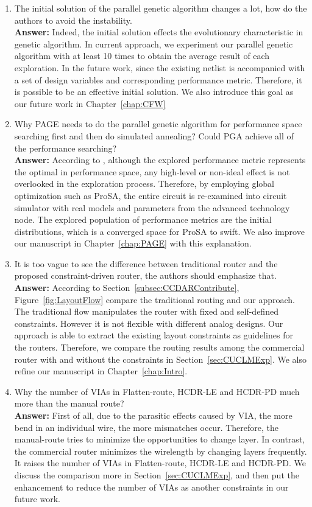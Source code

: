 \begin{enumerate}
  \item The initial solution of the parallel genetic algorithm changes a lot, how do the authors to avoid the instability.\\
  {\bf Answer:} Indeed, the initial solution effects the evolutionary characteristic in genetic algorithm. In current approach, we experiment our parallel genetic algorithm with at least 10 times to obtain the average result of each exploration. In the future work, since the existing netlist is accompanied with a set of design variables and corresponding performance metric. Therefore, it is possible to be an effective initial solution. We also introduce this goal as our future work in Chapter~\ref{chap:CFW}
  \item Why PAGE needs to do the parallel genetic algorithm for performance space searching first and then do simulated annealing? Could PGA achieve all of the performance searching?\\
  {\bf Answer:} According to \cite{PerfMap_ISQED2011}, although the explored performance metric represents the optimal in performance space, any high-level or non-ideal effect is not overlooked in the exploration process. Therefore, by employing global optimization such as ProSA, the entire circuit is re-examined into circuit simulator with real models and parameters from the advanced technology node. The explored population of performance metrics are the initial distributions, which is a converged space for ProSA to swift. We also improve our manuscript in Chapter~\ref{chap:PAGE} with this explanation.
  \item It is too vague to see the difference between traditional router and the proposed constraint-driven router, the authors should emphasize that. \\
  {\bf Answer:} According to Section~\ref{subsec:CCDARContribute}, Figure~\ref{fig:LayoutFlow} compare the traditional routing and our approach. The traditional flow manipulates the router with fixed and self-defined constraints. However it is not flexible with different analog designs. Our approach is able to extract the existing layout constraints as guidelines for the routers. Therefore, we compare the routing results among the commercial router with and without the constraints in Section~\ref{sec:CUCLMExp}. We also refine our manuscript in Chapter~\ref{chap:Intro}. 
  \item Why the number of VIAs in Flatten-route, HCDR-LE and HCDR-PD much more than the manual route? \\
  {\bf Answer:} First of all, due to the parasitic effects caused by VIA, the more bend in an individual wire, the more mismatches occur. Therefore, the manual-route tries to minimize the opportunities to change layer. In contrast, the commercial router minimizes the wirelength by changing layers frequently. It raises the number of VIAs in Flatten-route, HCDR-LE and HCDR-PD. We discuss the comparison more in Section~\ref{sec:CUCLMExp}, and then put the enhancement to reduce the number of VIAs as another constraints in our future work.

\end{enumerate}
